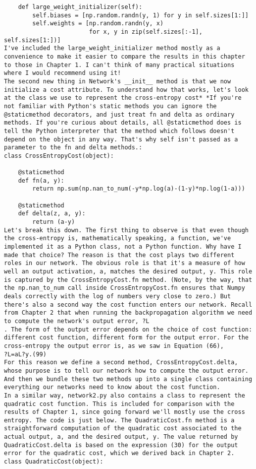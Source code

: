 \begin{lstlisting}
    def large_weight_initializer(self):
        self.biases = [np.random.randn(y, 1) for y in self.sizes[1:]]
        self.weights = [np.random.randn(y, x) 
                        for x, y in zip(self.sizes[:-1], self.sizes[1:])]
I've included the large_weight_initializer method mostly as a convenience to make it easier to compare the results in this chapter to those in Chapter 1. I can't think of many practical situations where I would recommend using it!
The second new thing in Network's __init__ method is that we now initialize a cost attribute. To understand how that works, let's look at the class we use to represent the cross-entropy cost* *If you're not familiar with Python's static methods you can ignore the @staticmethod decorators, and just treat fn and delta as ordinary methods. If you're curious about details, all @staticmethod does is tell the Python interpreter that the method which follows doesn't depend on the object in any way. That's why self isn't passed as a parameter to the fn and delta methods.:
class CrossEntropyCost(object):

    @staticmethod
    def fn(a, y):
        return np.sum(np.nan_to_num(-y*np.log(a)-(1-y)*np.log(1-a)))

    @staticmethod
    def delta(z, a, y):
        return (a-y)
Let's break this down. The first thing to observe is that even though the cross-entropy is, mathematically speaking, a function, we've implemented it as a Python class, not a Python function. Why have I made that choice? The reason is that the cost plays two different roles in our network. The obvious role is that it's a measure of how well an output activation, a, matches the desired output, y. This role is captured by the CrossEntropyCost.fn method. (Note, by the way, that the np.nan_to_num call inside CrossEntropyCost.fn ensures that Numpy deals correctly with the log of numbers very close to zero.) But there's also a second way the cost function enters our network. Recall from Chapter 2 that when running the backpropagation algorithm we need to compute the network's output error, ?L
. The form of the output error depends on the choice of cost function: different cost function, different form for the output error. For the cross-entropy the output error is, as we saw in Equation (66),
?L=aL?y.(99)
For this reason we define a second method, CrossEntropyCost.delta, whose purpose is to tell our network how to compute the output error. And then we bundle these two methods up into a single class containing everything our networks need to know about the cost function.
In a similar way, network2.py also contains a class to represent the quadratic cost function. This is included for comparison with the results of Chapter 1, since going forward we'll mostly use the cross entropy. The code is just below. The QuadraticCost.fn method is a straightforward computation of the quadratic cost associated to the actual output, a, and the desired output, y. The value returned by QuadraticCost.delta is based on the expression (30) for the output error for the quadratic cost, which we derived back in Chapter 2.
class QuadraticCost(object):


\end{lstlisting}
